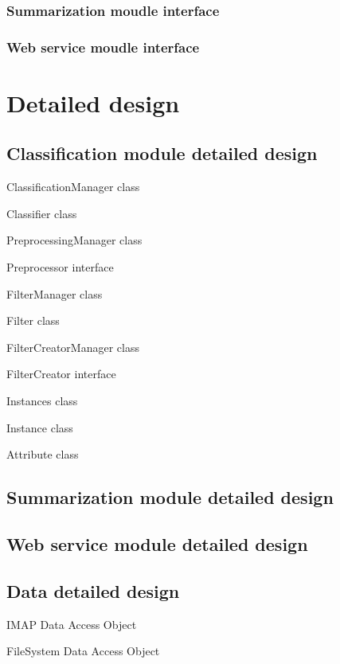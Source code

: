\documentclass[12pt]{article}
\newenvironment{my_itemize}
{\begin{itemize}
  \setlength{\itemsep}{0cm}
  \setlength{\parskip}{0cm}}
{\end{itemize}}
\begin{document}
\subsubsection{Summarization moudle interface}
\subsubsection{Web service moudle interface}

\section{Detailed design}

\subsection{Classification module detailed design}

\begin{my_itemize}
  \item ClassificationManager class
  \item Classifier class
  \item PreprocessingManager class
  \item Preprocessor interface
  \item FilterManager class
  \item Filter class
  \item FilterCreatorManager class
  \item FilterCreator interface
  \item Instances class
  \item Instance class
  \item Attribute class
\end{my_itemize}


\subsection{Summarization module detailed design}
\subsection{Web service module detailed design}
\subsection{Data detailed design}

\begin{my_itemize}
  \item IMAP Data Access Object
  \item FileSystem Data Access Object
\end{my_itemize}
\end{document}
